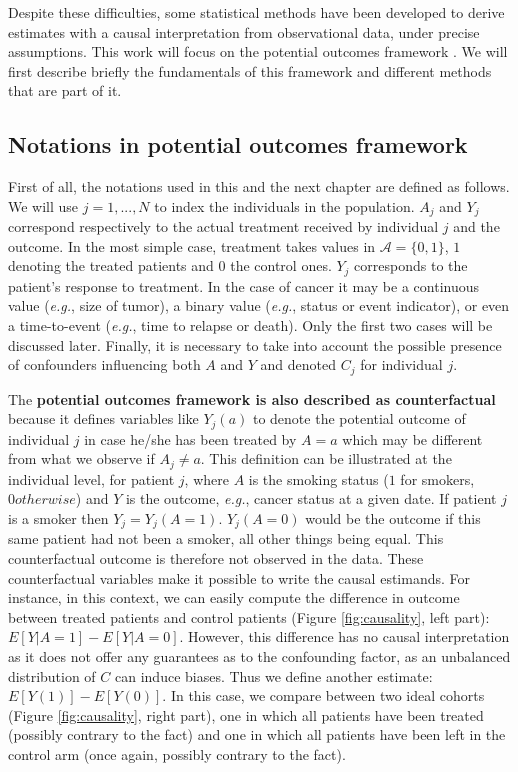 \documentclass[a4paper,12pt,twoside,onecolumn,openright,final,oldfontcommands]{memoir}
\begin{document}
Despite these difficulties, some statistical methods have been developed
to derive estimates with a causal interpretation from observational
data, under precise assumptions. This work will focus on the potential
outcomes framework \citep{rubin1974estimating}. We will first describe
briefly the fundamentals of this framework and different methods that
are part of it.

\subsection{Notations in potential outcomes
framework}\label{notations-in-potential-outcomes-framework}

First of all, the notations used in this and the next chapter are
defined as follows. We will use \(j=1,...,N\) to index the individuals
in the population. \(A_j\) and \(Y_j\) correspond respectively to the
actual treatment received by individual \(j\) and the outcome. In the
most simple case, treatment takes values in \(\mathcal{A}=\{0, 1\}\),
\(1\) denoting the treated patients and \(0\) the control ones. \(Y_j\)
corresponds to the patient's response to treatment. In the case of
cancer it may be a continuous value (\emph{e.g.}, size of tumor), a
binary value (\emph{e.g.}, status or event indicator), or even a
time-to-event (\emph{e.g.}, time to relapse or death). Only the first
two cases will be discussed later. Finally, it is necessary to take into
account the possible presence of confounders influencing both \(A\) and
\(Y\) and denoted \(C_j\) for individual \(j\).

The \textbf{potential outcomes framework is also described as
counterfactual} because it defines variables like \(Y_j(a)\) to denote
the potential outcome of individual \(j\) in case he/she has been
treated by \(A=a\) which may be different from what we observe if
\(A_j\neq a\). This definition can be illustrated at the individual
level, for patient \(j\), where \(A\) is the smoking status (\(1\) for
smokers, \(0 otherwise\)) and \(Y\) is the outcome, \emph{e.g.}, cancer
status at a given date. If patient \(j\) is a smoker then
\(Y_j=Y_j(A=1)\). \(Y_j(A=0)\) would be the outcome if this same patient
had not been a smoker, all other things being equal. This counterfactual
outcome is therefore not observed in the data. These counterfactual
variables make it possible to write the causal estimands. For instance,
in this context, we can easily compute the difference in outcome between
treated patients and control patients (Figure \ref{fig:causality}, left
part): \(E[Y | A=1] - E[Y | A=0].\) However, this difference has no
causal interpretation as it does not offer any guarantees as to the
confounding factor, as an unbalanced distribution of \(C\) can induce
biases. Thus we define another estimate: \(E[Y(1)] - E[Y(0)].\) In this
case, we compare between two ideal cohorts (Figure \ref{fig:causality},
right part), one in which all patients have been treated (possibly
contrary to the fact) and one in which all patients have been left in
the control arm (once again, possibly contrary to the fact).
\end{document}
